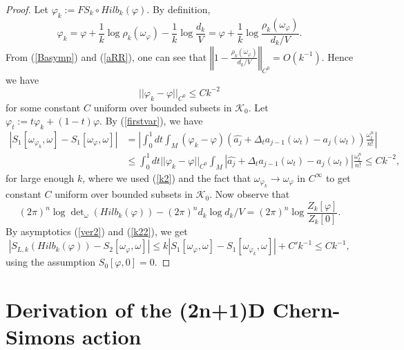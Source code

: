 \documentclass[12pt,reqno,a4paper]{amsart}
\numberwithin{equation}{section}
\theoremstyle{remark}
\theoremstyle{dotless}
\begin{document}
\begin{proof}
Let $\varphi_k:=FS_k\circ Hilb_k (\varphi)$. By definition,
\begin{equation*}
\varphi_k= \varphi + \frac{1}{k}\log \rho_k(\omega_\varphi) -\frac{1}{k}\log \frac{d_k}{V}=\varphi +\frac1k\log \frac{\rho_k(\omega_\varphi)}{d_k/V}.
\end{equation*}
From (\ref{Basymp}) and (\ref{aRR}), one can see that $\left\Vert 1- \frac{\rho_k(\omega_\varphi)}{d_k/V}\right\Vert_{C^0}=O(k^{-1})$. Hence we have
\begin{equation}\label{k2}
|| \varphi_k -\varphi ||_{C^0} \leq Ck^{-2}
\end{equation}
for some constant $C$ uniform over bounded subsets in $\mathcal{K}_0$. 
Let $\varphi_t:=t\varphi_k+(1-t)\varphi$. By (\ref{firstvar}), we have
\begin{align}
\left|S_1[\omega_{\varphi_k},\omega]-S_1[\omega_{\varphi},\omega]\right|&=\left|\int_0^1 dt \int_M(\varphi_k -\varphi)(\widehat{a_j}+\Delta_t a_{j-1}(\omega_t)-a_{j}(\omega_t))\frac{\omega_t^n}{n!}\right| \nonumber\\
&\leq \int_0^1 dt ||\varphi_k -\varphi||_{C^0}\int_M \left|\widehat{a_j}+\Delta_t a_{j-1}(\omega_t)-a_{j}(\omega_t)\right|\frac{\omega_t^n}{n!} \leq Ck^{-2}, \label{k22}
\end{align}
for large enough $k$, where we used (\ref{k2}) and the fact that $\omega_{\varphi_k}\rightarrow \omega_\varphi$ in $C^\infty$ to get constant $C$ uniform over bounded subsets in $\mathcal{K}_0$. Now observe that 
\begin{equation*}
(2\pi)^n\log \det\nolimits_{\omega} (Hilb_k(\varphi))-(2\pi)^n d_k\log d_k/V = (2\pi)^n\log \frac{Z_k[\varphi]}{Z_k[0]}.
\end{equation*}
By asymptotics (\ref{ver2}) and (\ref{k22}), we get
\begin{equation*}
\left| S_{L,k}(Hilb_k(\varphi))- S_2[\omega_\varphi,\omega] \right| \leq  k\left| S_1[\omega_\varphi,\omega] - S_1[\omega_{\varphi_k},\omega]\right| +C'k^{-1}\leq C k^{-1},
\end{equation*}
using the assumption $S_0[\varphi,0]=0$.
\end{proof}


\section{Derivation of the (2n+1)D Chern-Simons action}\label{sectioncs}
\end{document}

